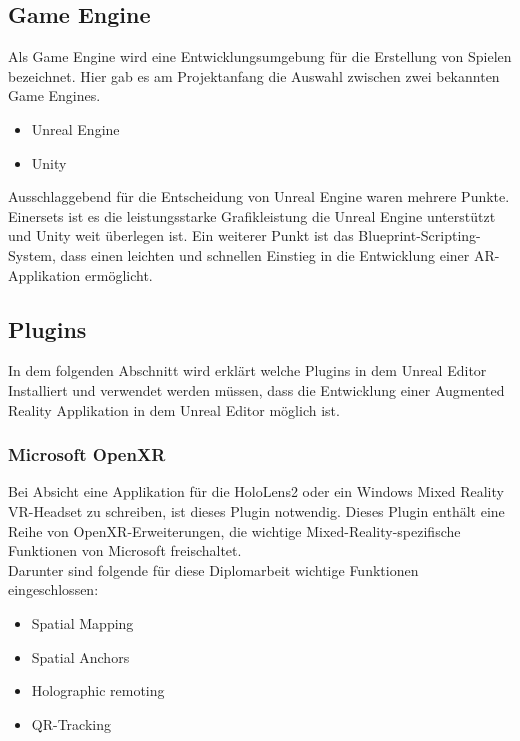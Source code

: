 \subsection{Game Engine}
Als Game Engine wird eine Entwicklungsumgebung für die Erstellung von Spielen bezeichnet.
Hier gab es am Projektanfang die Auswahl zwischen zwei bekannten Game Engines.
\begin{itemize}
    \item Unreal Engine
    \item Unity
\end{itemize}
Ausschlaggebend für die Entscheidung von Unreal Engine waren mehrere Punkte. Einersets ist es
die leistungsstarke Grafikleistung die Unreal Engine unterstützt und Unity weit überlegen ist.
Ein weiterer Punkt ist das Blueprint-Scripting-System, dass einen leichten und schnellen
Einstieg in die Entwicklung einer AR-Applikation ermöglicht.

\subsection{Plugins}
In dem folgenden Abschnitt wird erklärt welche Plugins in dem Unreal Editor
Installiert und verwendet werden müssen, dass die Entwicklung einer Augmented Reality
Applikation in dem Unreal Editor möglich ist.

\subsubsection{Microsoft OpenXR}
Bei Absicht eine Applikation für die HoloLens2 oder ein Windows Mixed Reality VR-Headset
zu schreiben, ist dieses Plugin notwendig. Dieses Plugin enthält eine Reihe von
OpenXR-Erweiterungen, die wichtige Mixed-Reality-spezifische Funktionen von Microsoft freischaltet. \\
Darunter sind folgende für diese Diplomarbeit wichtige Funktionen eingeschlossen:
\begin{itemize}
    \item Spatial Mapping
    \item Spatial Anchors
    \item Holographic remoting
    \item QR-Tracking
\end{itemize}

